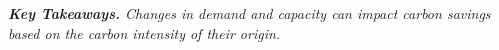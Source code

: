 \noindent \textit{\textbf{Key Takeaways.} 
Changes in demand and capacity can impact carbon savings based on the carbon intensity of their origin. %
}







